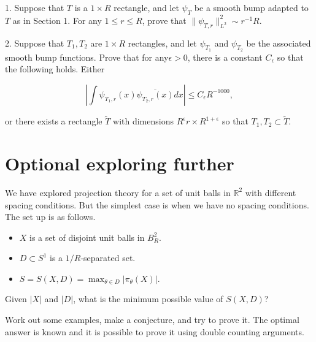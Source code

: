\documentclass{amsart}
\newcommand{\RR}{\mathbb{R}}
\begin{document}
\vskip10pt

1.  Suppose that $T$ is a $1 \times R$ rectangle,  and let $\psi_T$ be a smooth bump adapted to $T$ as in Section 1.  For any $1 \le r \le R$, 
prove that $\| \psi_{T, r} \|_{L^2}^2 \sim r^{-1} R$.  

\vskip10pt

2.  Suppose that $T_1,  T_2$ are $1 \times R$ rectangles,  and let $\psi_{T_1}$ and $\psi_{T_2}$ be the associated smooth bump functions.  Prove that for any$\epsilon > 0$,  there is a constant $C_\epsilon$ so that the following holds.  Either

$$ \left|  \int  \psi_{T_1, r}(x) \overline{ \psi_{T_2, r}(x)} dx \right| \le C_\epsilon R^{-1000}, $$

or there exists a rectangle $\tilde T$ with dimensions $R^\epsilon r \times R^{1 + \epsilon}$ so that $T_1,  T_2 \subset \tilde T$.

\section{Optional exploring further}

We have explored projection theory for a set of unit balls in $\RR^2$ with different spacing conditions.   But the simplest case is when we have no spacing conditions.   The set up is as follows.

\begin{itemize}
\item $X$ is a set of disjoint unit balls in $B_R^2$.

\item $D \subset S^1$ is a $1/R$-separated set.

\item $S = S(X,D) = \max_{\theta \in D} |\pi_\theta(X)|$.

\end{itemize}

Given $|X|$ and $|D|$,  what is the minimum possible value of $S(X,D)$?

Work out some examples,  make a conjecture,  and try to prove it.   The optimal answer is known and it is possible to prove it using double counting arguments.
\end{document}

